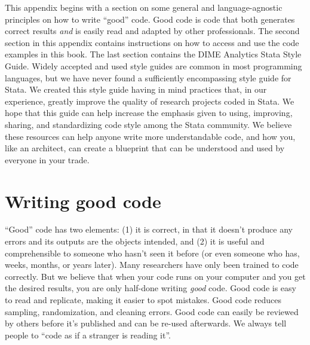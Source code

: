 \documentclass[
]{book}
\begin{document}
This appendix begins with a section on some general and language-agnostic
principles on how to write ``good'' code.
Good code is code that both generates correct results \emph{and}
is easily read and adapted by other professionals.
The second section in this appendix contains instructions
on how to access and use the code examples in this book.
The last section contains the DIME Analytics Stata Style Guide.
Widely accepted and used style guides are common in most programming languages,
but we have never found a sufficiently encompassing style guide for Stata.
We created this style guide having in mind practices that,
in our experience, greatly improve the quality
of research projects coded in Stata.
We hope that this guide can help increase the emphasis
given to using, improving, sharing, and standardizing code style
among the Stata community.
We believe these resources can help anyone write more understandable code,
and how you, like an architect,
can create a blueprint that can be understood and used
by everyone in your trade.

\hypertarget{writing-good-code}{%
\section*{Writing good code}\label{writing-good-code}}

``Good'' code has two elements:
(1) it is correct, in that it doesn't produce any errors
and its outputs are the objects intended,
and (2) it is useful and comprehensible
to someone who hasn't seen it before
(or even someone who has, weeks, months, or years later).
Many researchers have only been trained to code correctly.
But we believe that when your code runs on your computer
and you get the desired results,
you are only half-done writing \emph{good} code.
Good code is easy to read and replicate,
making it easier to spot mistakes.
Good code reduces sampling, randomization, and cleaning errors.
Good code can easily be reviewed by others
before it's published and can be re-used afterwards.
We always tell people to ``code as if a stranger is reading it''.
\end{document}
